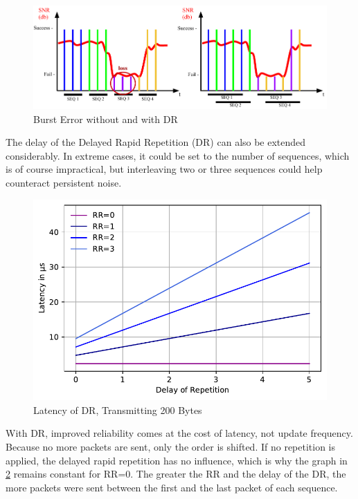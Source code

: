 \begin{figure}[h]
	\centering
	\includegraphics[scale=0.75]{figures/BadChannel.pdf}
	\caption{Burst Error without and with DR}
	\label{fig:badChannel}
\end{figure}

The delay of the Delayed Rapid Repetition (DR) can also be extended considerably.
In extreme cases, it could be set to the number of sequences, which is of course impractical,
but interleaving two or three sequences could help counteract persistent noise.

\begin{figure}[h]
	\centering
	\includegraphics[scale=0.60]{../Plot2/Graphs/bc_dr.pdf}
	\caption{Latency of DR, Transmitting 200 Bytes}
	\label{fig:dr_delay}
\end{figure}

With DR, improved reliability comes at the cost of latency, not update frequency.
Because no more packets are sent, only the order is shifted.
If no repetition is applied, the delayed rapid repetition has no influence,
which is why the graph in \cref{fig:dr_delay} remains constant for RR=0.
The greater the RR and the delay of the DR, the more packets were sent
between the first and the last packet of each sequence.

